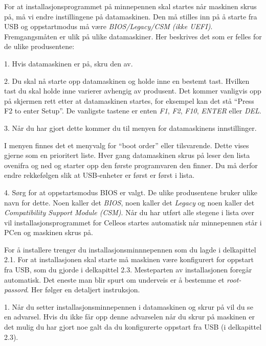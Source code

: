 For at installasjonsprogrammet p\aa{} minnepennen skal startes n\aa r maskinen skrus p\aa , m\aa{} vi endre instillingene p\aa{} datamaskinen. Den m\aa{} stilles inn p\aa{} \aa{} starte fra USB og oppstartmodus m\aa{} v\ae re {\it BIOS/Legacy/CSM (ikke UEFI)}. Fremgangsm\aa ten er ulik p\aa{} ulike datamaskiner. Her beskrives det som er felles for de ulike produsentene: 
\item{1.} Hvis datamaskinen er p\aa, skru den av.
\item{2.} Du skal n\aa{} starte opp datamaskinen og holde inne en bestemt tast. Hvilken tast du skal holde inne varierer avhengig av produsent. Det kommer vanligvis opp p\aa{} skjermen rett etter at datamaskinen startes, for eksempel kan det st\aa{} ``Press F2 to enter Setup''. De vanligste tastene er enten {\it F1}, {\it F2}, {\it F10}, {\it ENTER} eller {\it DEL}.
\item{3.} N\aa r du har gjort dette kommer du til menyen for datamaskinens innstillinger. 
\medskip
{}
\item{} I menyen finnes det et menyvalg for ``boot order'' eller tilsvarende. Dette vises gjerne som en prioritert liste. Hver gang datamaskinen skrus p\aa{} leser den lista ovenifra og ned og starter opp den f\o rste programvaren den finner. Du m\aa{} derfor endre rekkef\o lgen slik at USB-enheter er f\o rst er f\o rst i lista.
\item{4.} S\o rg for at oppstartsmodus BIOS er valgt. De ulike produsentene bruker ulike navn for dette. Noen kaller det {\it BIOS}, noen kaller det {\it Legacy} og noen kaller det {\it Compatibility Support Module (CSM)}.
\smallskip
\noindent N\aa r du har utf\o rt alle stegene i lista over vil installasjonsprogrammet for Celleos startes automatisk n\aa r minnepennen st\aa r i PCen og maskinen skrus p\aa.



For \aa{} installere trenger du installasjons\-minnnepennen som du lagde i delkapittel 2.1. For at installasjonen skal starte m\aa{} maskinen v\ae re konfigurert for oppstart fra USB, som du gjorde i delkapittel 2.3. Mesteparten av installasjonen foreg\aa r automatisk. Det eneste man blir spurt om underveis er \aa{} bestemme et {\it root-passord}. Her f\o lger en detaljert instruksjon.
\item{1.} N\aa r du setter installasjonsminnepennen i datamaskinen og skrur p\aa{} vil du se en advarsel. Hvis du ikke f\aa r opp denne advarselen n\aa r du skrur p\aa{} maskinen er det mulig du har gjort noe galt da du konfigurerte oppstart fra USB (i delkapittel 2.3).
\medskip
{}


